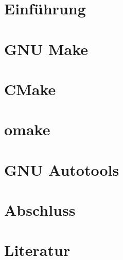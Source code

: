 \documentclass{beamer}
\begin{document}

	\section{Einführung}
	
	

	\section{GNU Make}
	

	\section{CMake}
	\section{omake}
	\section{GNU Autotools}

	\section{Abschluss}
	

	\section{Literatur}
	
	
\end{document}
